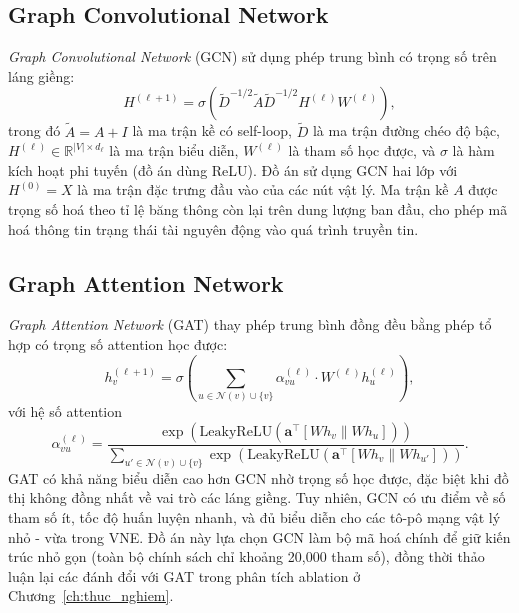 \documentclass[../DoAn.tex]{subfiles}
\begin{document}
\subsection{Graph Convolutional Network}

\textit{Graph Convolutional Network} (GCN)\cite{kipf2017gcn} sử dụng phép trung bình có trọng số trên láng giềng:
\begin{equation}
    H^{(\ell+1)} = \sigma\left( \tilde{D}^{-1/2} \tilde{A} \tilde{D}^{-1/2} H^{(\ell)} W^{(\ell)} \right),
    \label{eq:gcn}
\end{equation}
trong đó $\tilde{A} = A + I$ là ma trận kề có self-loop, $\tilde{D}$ là ma trận đường chéo độ bậc, $H^{(\ell)} \in \mathbb{R}^{|V| \times d_\ell}$ là ma trận biểu diễn, $W^{(\ell)}$ là tham số học được, và $\sigma$ là hàm kích hoạt phi tuyến (đồ án dùng ReLU). Đồ án sử dụng GCN hai lớp với $H^{(0)} = X$ là ma trận đặc trưng đầu vào của các nút vật lý. Ma trận kề $A$ được trọng số hoá theo tỉ lệ băng thông còn lại trên dung lượng ban đầu, cho phép mã hoá thông tin trạng thái tài nguyên động vào quá trình truyền tin.

\subsection{Graph Attention Network}

\textit{Graph Attention Network} (GAT)\cite{velickovic2018gat} thay phép trung bình đồng đều bằng phép tổ hợp có trọng số attention học được:
\begin{equation}
    h_v^{(\ell+1)} = \sigma\left( \sum_{u \in \mathcal{N}(v) \cup \{v\}} \alpha_{vu}^{(\ell)} \cdot W^{(\ell)} h_u^{(\ell)} \right),
\end{equation}
với hệ số attention
\begin{equation}
    \alpha_{vu}^{(\ell)} = \frac{\exp\left( \text{LeakyReLU}(\mathbf{a}^\top [W h_v \| W h_u]) \right)}{\sum_{u' \in \mathcal{N}(v) \cup \{v\}} \exp\left( \text{LeakyReLU}(\mathbf{a}^\top [W h_v \| W h_{u'}]) \right)}.
\end{equation}
GAT có khả năng biểu diễn cao hơn GCN nhờ trọng số học được, đặc biệt khi đồ thị không đồng nhất về vai trò các láng giềng. Tuy nhiên, GCN có ưu điểm về số tham số ít, tốc độ huấn luyện nhanh, và đủ biểu diễn cho các tô-pô mạng vật lý nhỏ - vừa trong VNE. Đồ án này lựa chọn GCN làm bộ mã hoá chính để giữ kiến trúc nhỏ gọn (toàn bộ chính sách chỉ khoảng 20{,}000 tham số), đồng thời thảo luận lại các đánh đổi với GAT trong phân tích ablation ở Chương~\ref{ch:thuc_nghiem}.
\end{document}
